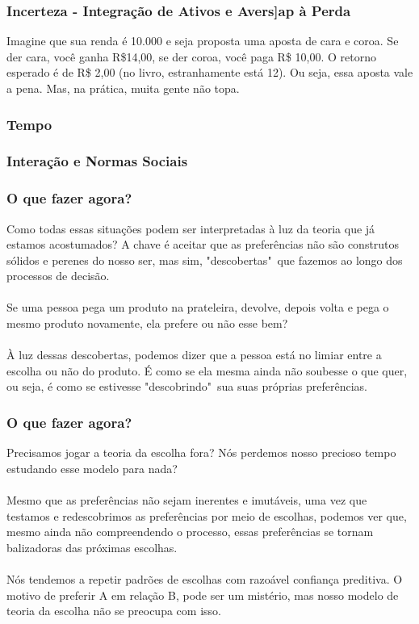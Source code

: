\documentclass{beamer}[10]
\begin{document}
\begin{frame}
	\frametitle{Incerteza - Integração de Ativos e Avers]ap à Perda}

	Imagine que sua renda é 10.000 e seja proposta uma aposta de cara e coroa. Se der cara, você ganha R\$14,00, se der coroa, você paga R\$ 10,00. O retorno esperado é de R\$ 2,00 (no livro, estranhamente está 12). Ou seja, essa aposta vale a pena. Mas, na prática, muita gente não topa.

\end{frame}

\begin{frame}
	\frametitle{Tempo}

	

\end{frame}

\begin{frame}
	\frametitle{Interação e Normas Sociais}

	

\end{frame}

\begin{frame}
	\frametitle{O que fazer agora?}

	Como todas essas situações podem ser interpretadas à luz da teoria que já estamos acostumados? A chave é aceitar que as preferências não são construtos sólidos e perenes do nosso ser, mas sim, "descobertas"\ que fazemos ao longo dos processos de decisão.
	\\~\\
	Se uma pessoa pega um produto na prateleira, devolve, depois volta e pega o mesmo produto novamente, ela prefere ou não esse bem? 
	\\~\\
	À luz dessas descobertas, podemos dizer que a pessoa está no limiar entre a escolha ou não do produto. É como se ela mesma ainda não soubesse o que quer, ou seja, é como se estivesse "descobrindo"\ sua suas próprias preferências.

\end{frame}

\begin{frame}
	\frametitle{O que fazer agora?}

	Precisamos jogar a teoria da escolha fora? 	Nós perdemos nosso precioso tempo estudando esse modelo para nada? 
	\\~\\
	Mesmo que as preferências não sejam inerentes e imutáveis, uma vez que testamos e redescobrimos as preferências por meio de escolhas, podemos ver que, mesmo ainda não compreendendo o processo, essas preferências se tornam balizadoras das próximas escolhas. 
	\\~\\
	Nós tendemos a repetir padrões de escolhas com razoável confiança preditiva. O motivo de preferir A em relação B, pode ser um mistério, mas nosso modelo de teoria da escolha não se preocupa com isso.

\end{frame}
\end{document}
